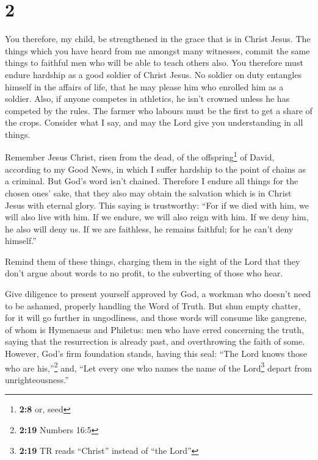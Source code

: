 \hypertarget{section-1}{%
\section{2}\label{section-1}}

 You therefore, my child, be strengthened in the grace
that is in Christ Jesus.  The things which you have heard
from me amongst many witnesses, commit the same things to faithful men
who will be able to teach others also.  You therefore must
endure hardship as a good soldier of Christ Jesus.  No
soldier on duty entangles himself in the affairs of life, that he may
please him who enrolled him as a soldier.  Also, if anyone
competes in athletics, he isn't crowned unless he has competed by the
rules.  The farmer who labours must be the first to get a
share of the crops.  Consider what I say, and may the Lord
give you understanding in all things.

 Remember Jesus Christ, risen from the dead, of the
offspring\footnote{\textbf{2:8} or, seed} of David, according to my Good
News,  in which I suffer hardship to the point of chains
as a criminal. But God's word isn't chained.  Therefore I
endure all things for the chosen ones' sake, that they also may obtain
the salvation which is in Christ Jesus with eternal glory.
 This saying is trustworthy: ``For if we died with him,
we will also live with him.  If we endure, we will also
reign with him. If we deny him, he also will deny us.  If
we are faithless, he remains faithful; for he can't deny himself.''

 Remind them of these things, charging them in the sight
of the Lord that they don't argue about words to no profit, to the
subverting of those who hear.

 Give diligence to present yourself approved by God, a
workman who doesn't need to be ashamed, properly handling the Word of
Truth.  But shun empty chatter, for it will go further in
ungodliness,  and those words will consume like gangrene,
of whom is Hymenaeus and Philetus:  men who have erred
concerning the truth, saying that the resurrection is already past, and
overthrowing the faith of some.  However, God's firm
foundation stands, having this seal: ``The Lord knows those who are
his,''\footnote{\textbf{2:19} Numbers 16:5} and, ``Let every one who
names the name of the Lord\footnote{\textbf{2:19} TR reads ``Christ''
  instead of ``the Lord''} depart from unrighteousness.''

